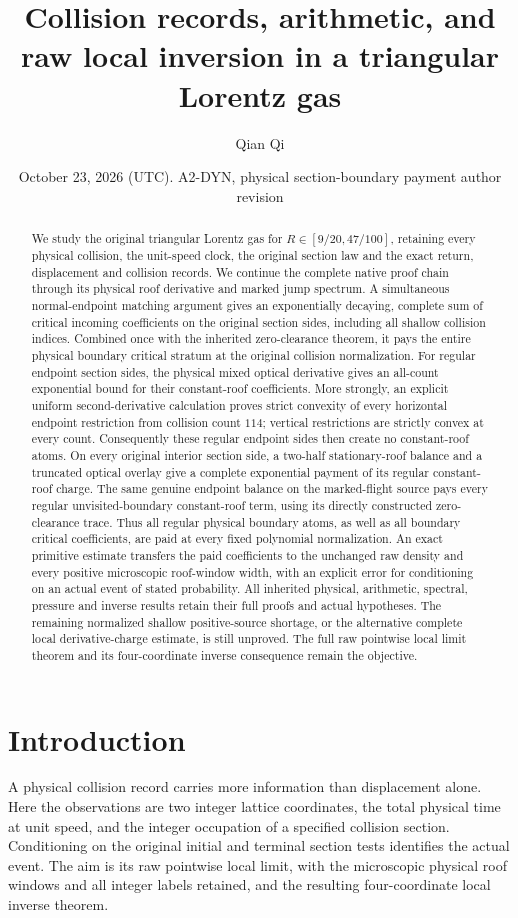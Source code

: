 \documentclass[11pt,reqno]{amsart}
\title[Collision records and raw local inversion]{Collision records, arithmetic, and raw local inversion in a triangular Lorentz gas}
\author{Qian Qi}
\date{October 23, 2026 (UTC). A2-DYN, physical section-boundary payment author revision}
\numberwithin{equation}{section}
\theoremstyle{definition}\newtheorem{definition}[theorem]{Definition}
\theoremstyle{remark}\newtheorem{remark}[theorem]{Remark}
\begin{document}
\raggedbottom
\begin{abstract}
We study the original triangular Lorentz gas for
$R\in[9/20,47/100]$, retaining every physical collision, the
unit-speed clock, the original section law and the exact return,
displacement and collision records. We continue the complete
native proof chain through its physical roof derivative and
marked jump spectrum. A simultaneous normal-endpoint matching
argument gives an exponentially decaying, complete sum of
critical incoming coefficients on the original section sides,
including all shallow collision indices. Combined once with the
inherited zero-clearance theorem, it pays the entire physical
boundary critical stratum at the original collision normalization.
For regular endpoint section sides, the physical mixed optical
derivative gives an all-count exponential bound for their
constant-roof coefficients. More strongly, an explicit uniform
second-derivative calculation proves strict convexity of every
horizontal endpoint restriction from collision count $114$;
vertical restrictions are strictly convex at every count.
Consequently these regular endpoint sides then create no
constant-roof atoms. On every original interior section side, a
two-half stationary-roof balance and a truncated optical overlay
give a complete exponential payment of its regular constant-roof
charge. The same genuine endpoint balance on the marked-flight
source pays every regular unvisited-boundary constant-roof term,
using its directly constructed zero-clearance trace. Thus all
regular physical boundary atoms, as well as all boundary critical
coefficients, are paid at every fixed polynomial normalization.
An exact primitive estimate transfers the
paid coefficients to the unchanged raw density and every
positive microscopic roof-window width, with an explicit error
for conditioning on an actual event of stated probability.
All inherited physical, arithmetic, spectral, pressure and
inverse results retain their full proofs and actual hypotheses.
The remaining normalized shallow positive-source shortage,
or the alternative complete local derivative-charge estimate,
is still unproved. The full raw pointwise local limit theorem
and its four-coordinate inverse consequence remain the objective.
\end{abstract}
\maketitle
\tableofcontents

\section*{Introduction}
A physical collision record carries more information than displacement
alone. Here the observations are two integer lattice coordinates, the
total physical time at unit speed, and the integer occupation of a
specified collision section. Conditioning on the original initial
and terminal section tests identifies the actual event. The aim is
its raw pointwise local limit, with the microscopic physical roof
windows and all integer labels retained, and the resulting
four-coordinate local inverse theorem.
\end{document}
